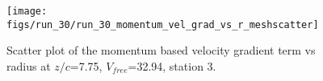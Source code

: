 \begin{figure}[H]
\centering
\texttt{[image: figs/run\_30/run\_30\_momentum\_vel\_grad\_vs\_r\_meshscatter]}
\caption{Scatter plot of the momentum based velocity gradient term vs radius at $z/c$=7.75, $V_{free}$=32.94, station 3.}
\label{fig:run_30_momentum_vel_grad_vs_r_meshscatter}
\end{figure}



